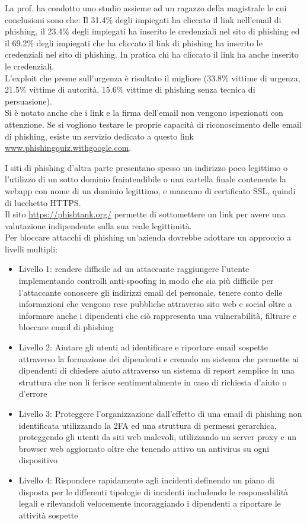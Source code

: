 La prof. ha condotto uno studio assieme ad un ragazzo della magistrale le cui conclusioni sono che:
Il 31.4\% degli impiegati ha cliccato il link nell'email di phishing, il 23.4\% degli impiegati ha inserito le credenziali nel sito di phishing ed il 69.2\% degli impiegati che ha cliccato il link di phishing ha inserito le credenziali nel sito di phishing.
In pratica chi ha cliccato il link ha anche inserito le credenziali.\\
L'exploit che preme sull'urgenza è risultato il migliore (33.8\% vittime di urgenza, 21.5\% vittime di autorità, 15.6\% vittime di phishing senza tecnica di persuasione).\\
Si è notato anche che i link e la firma dell'email non vengono ispezionati con attenzione.
Se si vogliono testare le proprie capacità di riconoscimento delle email di phishing, esiste un servizio dedicato a questo link \url{www.phishingquiz.withgoogle.com}.

I siti di phishing d'altra parte presentano spesso un indirizzo poco legittimo o l'utilizzo di un sotto dominio fraintendibile o una cartella finale contenente la webapp con nome di un dominio legittimo, e mancano di certificato \acrshort{SSL}, quindi di lucchetto \acrshort{HTTPS}.\\
Il sito \url{https://phishtank.org/} permette di sottomettere un link per avere una valutazione indipendente sulla sua reale legittimità.\\
Per bloccare attacchi di phishing un'azienda dovrebbe adottare un approccio a livelli multipli:
\begin{itemize}[noitemsep]
    \item Livello 1: rendere difficile ad un attaccante raggiungere l'utente implementando controlli anti-spoofing in modo che sia più difficile per l'attaccante conoscere gli indirizzi email del personale, tenere conto delle informazioni che vengono rese pubbliche attraverso sito web e social oltre a informare anche i dipendenti che ciò rappresenta una vulnerabilità, filtrare e bloccare email di phishing
    \item Livello 2: Aiutare gli utenti ad identificare e riportare email sospette attraverso la formazione dei dipendenti e creando un sistema che permette ai dipendenti di chiedere aiuto attraverso un sistema di report semplice in una struttura che non li ferisce sentimentalmente in caso di richiesta d'aiuto o d'errore
    \item Livello 3: Proteggere l'organizzazione dall'effetto di una email di phishing non identificata utilizzando la \acrfull{2FA} ed una struttura di permessi gerarchica, proteggendo gli utenti da siti web malevoli, utilizzando un server proxy e un browser web aggiornato oltre che tenendo attivo un antivirus su ogni dispositivo
    \item Livello 4: Rispondere rapidamente agli incidenti definendo un piano di disposta per le differenti tipologie di incidenti includendo le responsabilità legali e rilevandoli velocemente incoraggiando i dipendenti a riportare le attività sospette
\end{itemize}
